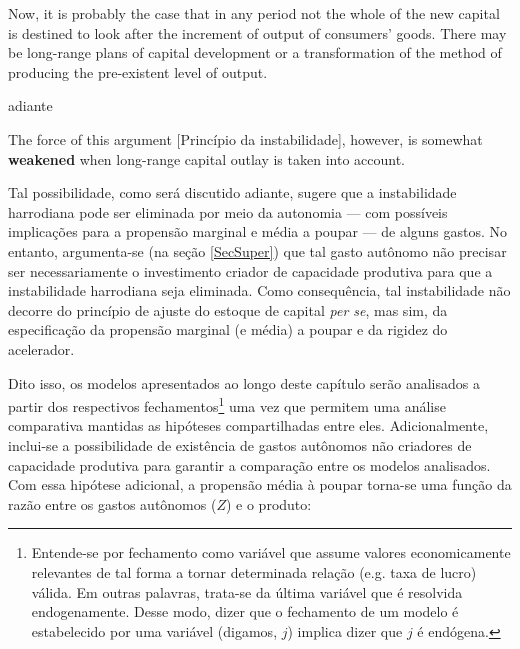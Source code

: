 \begin{citacao}
Now, it is probably the case that in any period not the whole of the new capital is destined to look after the increment of output of consumers' goods. There may be  long-range plans of capital development or a transformation  of the method of  producing  the pre-existent level of output. \cite[p.~17]{harrod_essay_1939}
\end{citacao}
adiante
\begin{citacao}
The force  of this  argument [Princípio da instabilidade], however, is somewhat \textbf{weakened} when long-range  capital outlay is taken into account.
\cite[p.~26, grifos adicionados]{harrod_essay_1939}
\end{citacao}
Tal possibilidade, como será discutido adiante, sugere que a instabilidade harrodiana pode ser eliminada por meio da autonomia --- com possíveis implicações para a propensão marginal e média a poupar ---  de alguns gastos.
No entanto, argumenta-se (na seção \ref{SecSuper}) que tal gasto autônomo não precisar ser necessariamente o investimento criador de capacidade produtiva para que a instabilidade harrodiana seja eliminada.
Como consequência, tal instabilidade não decorre do princípio de ajuste do estoque de capital \textit{per se}, mas sim, da especificação da propensão marginal (e média) a poupar e da rigidez do acelerador.

Dito isso, os modelos apresentados ao longo deste capítulo serão analisados a partir dos respectivos  fechamentos\footnote{Entende-se por fechamento como variável que assume valores economicamente relevantes de tal forma a tornar determinada relação (e.g. taxa de lucro) válida. Em outras palavras, trata-se da última variável que é resolvida endogenamente. Desse modo, dizer que o fechamento de um modelo é estabelecido por uma variável (digamos, $j$) implica dizer que $j$ é endógena.} uma vez que permitem uma análise comparativa mantidas as hipóteses compartilhadas entre eles. 
Adicionalmente, inclui-se a possibilidade de existência de gastos autônomos não criadores de capacidade produtiva para garantir a comparação entre os modelos analisados. Com essa hipótese adicional, a propensão média à poupar torna-se uma função da razão entre os gastos autônomos ($Z$) e o produto:


